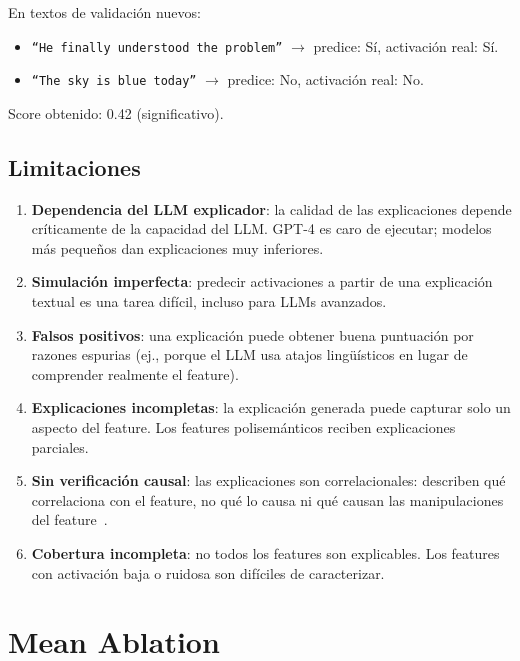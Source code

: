 \documentclass[11pt,a4paper]{report}
\theoremstyle{definition}
\begin{document}
En textos de validación nuevos:
\begin{itemize}
    \item \texttt{``He \textbf{finally} understood the problem''} $\rightarrow$ predice: Sí, activación real: Sí.
    \item \texttt{``The sky is blue today''} $\rightarrow$ predice: No, activación real: No.
\end{itemize}

Score obtenido: 0.42 (significativo).

\section{Limitaciones}

\begin{enumerate}
    \item \textbf{Dependencia del LLM explicador}: la calidad de las explicaciones depende críticamente de la capacidad del LLM. GPT-4 es caro de ejecutar; modelos más pequeños dan explicaciones muy inferiores.
    \item \textbf{Simulación imperfecta}: predecir activaciones a partir de una explicación textual es una tarea difícil, incluso para LLMs avanzados.
    \item \textbf{Falsos positivos}: una explicación puede obtener buena puntuación por razones espurias (ej., porque el LLM usa atajos lingüísticos en lugar de comprender realmente el feature).
    \item \textbf{Explicaciones incompletas}: la explicación generada puede capturar solo un aspecto del feature. Los features polisemánticos reciben explicaciones parciales.
    \item \textbf{Sin verificación causal}: las explicaciones son correlacionales: describen qué correlaciona con el feature, no qué lo causa ni qué causan las manipulaciones del feature~\cite{makelov2024saeidentity}.
    \item \textbf{Cobertura incompleta}: no todos los features son explicables. Los features con activación baja o ruidosa son difíciles de caracterizar.
\end{enumerate}

\newpage

\chapter{Mean Ablation}
\label{ch:mean-ablation}
\end{document}
